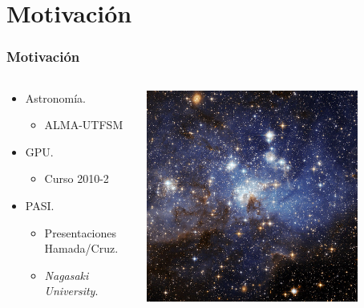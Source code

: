 \section{Motivación}
\frame
{
\frametitle{Motivación}
\begin{columns}
  \begin{column}{0.5\textwidth}
	\begin{itemize}
		\item Astronomía.
		\begin{itemize}
			\item ALMA-UTFSM
		\end{itemize}
		\item GPU.
		\begin{itemize}
			\item Curso 2010-2
		\end{itemize}
		\item PASI.
		\begin{itemize}
			\item Presentaciones Hamada/Cruz.
			\item \textit{Nagasaki University}.
		\end{itemize}
	\end{itemize}
  \end{column}
  \begin{column}{0.5\textwidth}
	\includegraphics[width=0.8\textwidth]{img/stars}
  \end{column}
\end{columns}
}
